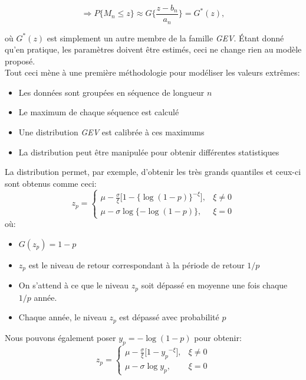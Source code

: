 \begin{equation*}
\Rightarrow P\{M_n\le z\} \approx G\Bigg\{\frac{z- b_n}{a_n}\Bigg\} = G^*(z), 
\end{equation*}

où $G^*(z)$ est simplement un autre membre de la famille \textit{GEV}. Étant donné qu'en pratique, les paramètres doivent être estimés, ceci ne change rien au modèle proposé.\\

Tout ceci mène à une première méthodologie pour modéliser les valeurs extrêmes:

\begin{itemize}
\item Les données sont groupées en séquence de longueur $n$
\item Le maximum de chaque séquence est calculé
\item Une distribution \textit{GEV} est calibrée à ces maximums
\item La distribution peut être manipulée pour obtenir différentes statistiques
\end{itemize}

La distribution permet, par exemple, d'obtenir les très grands quantiles et ceux-ci sont obtenus comme ceci:
\begin{equation}\label{eq:1.1.4}
z_p =
\begin{cases}
\mu - \frac{\sigma}{\xi}\Big[1 - \{\log(1-p)\}^{-\xi}\Big], & \xi \ne 0 \\
\mu - \sigma\log\{-\log(1-p)\}, & \xi = 0
\end{cases}
\end{equation}
où:
\begin{itemize}
\item $G(z_p) = 1-p$
\item $z_p$ est le niveau de retour correspondant à la période de retour ${1}/{p}$
\item On s'attend à ce que le niveau $z_p$ soit dépassé en moyenne une fois chaque $1/p$ année.
\item Chaque année, le niveau $z_p$ est dépassé avec probabilité $p$
\end{itemize}

Nous pouvons également poser $y_p = -\log(1-p)$ pour obtenir:
\begin{equation}\label{eq:1.1.5}
z_p =
\begin{cases}
\mu - \frac{\sigma}{\xi}\Big[1 - {y_p}^{-\xi}\Big], & \xi \ne 0 \\
\mu - \sigma\log{y_p}, & \xi = 0
\end{cases}
\end{equation}
\\

